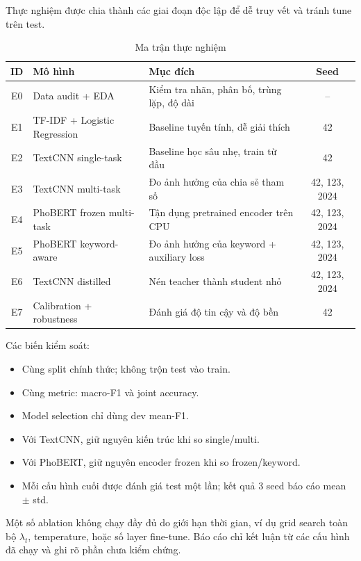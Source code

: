 \documentclass[12pt,a4paper]{report}
\begin{document}
Thực nghiệm được chia thành các giai đoạn độc lập để dễ truy vết và tránh tune trên test.

\begin{table}[H]
\centering
\caption{Ma trận thực nghiệm}
\begin{tabularx}{\textwidth}{@{}clXc@{}}
\toprule
\textbf{ID} & \textbf{Mô hình} & \textbf{Mục đích} & \textbf{Seed} \\
\midrule
E0 & Data audit + EDA & Kiểm tra nhãn, phân bố, trùng lặp, độ dài & -- \\
E1 & TF-IDF + Logistic Regression & Baseline tuyến tính, dễ giải thích & 42 \\
E2 & TextCNN single-task & Baseline học sâu nhẹ, train từ đầu & 42 \\
E3 & TextCNN multi-task & Đo ảnh hưởng của chia sẻ tham số & 42, 123, 2024 \\
E4 & PhoBERT frozen multi-task & Tận dụng pretrained encoder trên CPU & 42, 123, 2024 \\
E5 & PhoBERT keyword-aware & Đo ảnh hưởng của keyword + auxiliary loss & 42, 123, 2024 \\
E6 & TextCNN distilled & Nén teacher thành student nhỏ & 42, 123, 2024 \\
E7 & Calibration + robustness & Đánh giá độ tin cậy và độ bền & 42 \\
\bottomrule
\end{tabularx}
\end{table}

Các biến kiểm soát:

\begin{itemize}[leftmargin=1.2cm]
  \item Cùng split chính thức; không trộn test vào train.
  \item Cùng metric: macro-F1 và joint accuracy.
  \item Model selection chỉ dùng dev mean-F1.
  \item Với TextCNN, giữ nguyên kiến trúc khi so single/multi.
  \item Với PhoBERT, giữ nguyên encoder frozen khi so frozen/keyword.
  \item Mỗi cấu hình cuối được đánh giá test một lần; kết quả 3 seed báo cáo mean \(\pm\) std.
\end{itemize}

Một số ablation không chạy đầy đủ do giới hạn thời gian, ví dụ grid search toàn bộ \(\lambda_t\), temperature, hoặc số layer fine-tune. Báo cáo chỉ kết luận từ các cấu hình đã chạy và ghi rõ phần chưa kiểm chứng.
\end{document}
